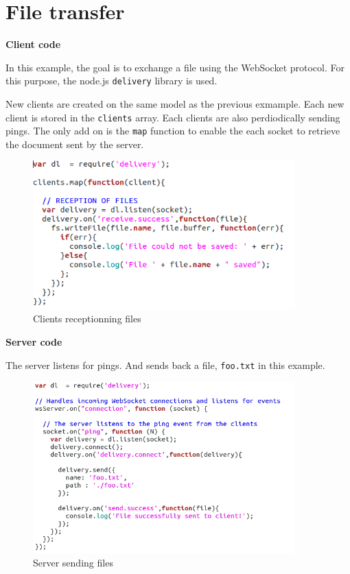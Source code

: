 \section{File transfer}

\textbf{Client code}

In this example, the goal is to exchange a file using the WebSocket protocol.
For this purpose, the node.js \texttt{delivery} library is used.

New clients are created on the same model as the previous exmample. Each new
client is stored in the \texttt{clients} array. Each clients are also
perdiodically sending pings. The only add on is the \texttt{map} function to
enable the each socket to retrieve the document sent by the server. 

\begin{figure}[H] \centering
  \includegraphics[width=0.9\textwidth]{./Figures/WS_client_delivery.png}
\caption[WS_client_fileTransfer]{Clients receptionning files} 
\label{fig:WS_client_fileTransfer}
\end{figure}

\textbf{Server code}

The server listens for pings. And sends back a file, \texttt{foo.txt} in this
example.

\begin{figure}[H]
	\centering
    \includegraphics[width=0.9\textwidth]{./Figures/WS_server_delivery.png}
	\caption[WS_server_simplePong]{Server sending files}
	\label{fig:WS_server_simplePong}
\end{figure}
